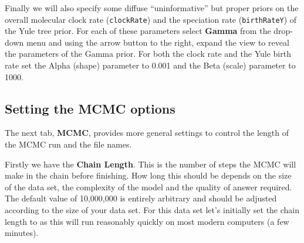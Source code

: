 \documentclass[11pt]{article}
\newcommand{\TODO}[1]{}
\theoremstyle{plain}%
\theoremstyle{definition}
\theoremstyle{remark}
\begin{document}
Finally we will also specify some diffuse ``uninformative'' but proper priors on the overall molecular clock rate (\texttt{clockRate}) and the speciation rate (\texttt{birthRateY}) of the Yule tree prior. For each of these parameters select \textbf{Gamma} from the drop-down menu and using the arrow button to the right, expand the view to reveal the parameters of the Gamma prior. For both the clock rate and the Yule birth rate set the Alpha (shape) parameter to 0.001 and the Beta (scale) parameter to 1000.




\subsection{Setting the MCMC options}


The next tab, {\bf MCMC}, provides more general
settings to control the length of the MCMC run and the file names. 

Firstly we have the \textbf{Chain Length}. This is the number of
steps the MCMC will make in the chain before finishing. How long this
should be depends on the size of the data set, the complexity of the
model and the quality of answer required. The default value of 10,000,000
is entirely arbitrary and should be adjusted according to the size
of your data set. For this data set let's initially set the chain
length to \chainLength{} as this will run reasonably quickly on most modern
computers (a few minutes).

\end{document}
